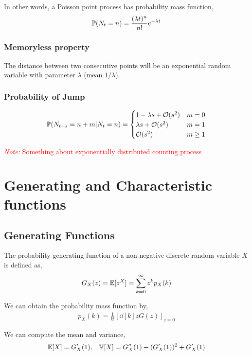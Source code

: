 \documentclass[12pt]{article}
\newcommand{\note}[1]{\textcolor{red}{\textit{Note:} #1}}
\begin{document}
In other words, a Poisson point process has probability mass function,
\begin{align*}
    \mathbb{P}(N_t=n) = \frac{(\lambda t)^n}{n!}e^{-\lambda t}
\end{align*}

\subsubsection{Memoryless property} 
The distance between two consecutive points will be an exponential random variable with parameter \( \lambda \) (mean \( 1/\lambda \)).

\subsubsection{Probability of Jump}
\begin{align*}
    \mathbb{P}(N_{t+s}=n+m | N_t =n) = 
    \begin{cases}
        1-\lambda s + \mathcal{O}(s^2) & m = 0 \\
        \lambda s + \mathcal{O}(s^2) & m = 1 \\
        \mathcal{O}(s^2) & m \geq 1
    \end{cases} 
\end{align*}

\note{Something about exponentially distributed counting process}


\pagebreak
\section{Generating and Characteristic functions}

\subsection{Generating Functions}
The probability generating function of a non-negative discrete random variable \( X \) is defined as,
\begin{align*}
    G_X(z) = \mathbb{E}[z^X] = \sum_{k=0}^{\infty} z^k p_X(k)
\end{align*}

We can obtain the probability mass function by,
\begin{align*}
    p_X(k) = \frac{1}{k!} \left[ \dd[k]{}{z} G(z) \right]_{z=0}
\end{align*}

We can compute the mean and variance,
\begin{align*}
    \mathbb{E}[X] = G_X'(1)
    , && 
    \mathbb{V}[X] = G_X''(1) - (G_X'(1))^2+G_X'(1)
\end{align*}
\end{document}
